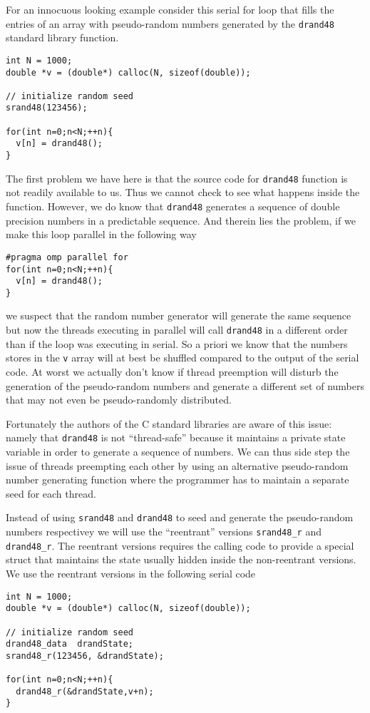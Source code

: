 For an innocuous looking example consider this serial for loop that fills the entries of an array with pseudo-random numbers generated by the \texttt{drand48} standard library function.
\begin{verbatim}
int N = 1000;
double *v = (double*) calloc(N, sizeof(double));

// initialize random seed
srand48(123456);

for(int n=0;n<N;++n){
  v[n] = drand48();
}
\end{verbatim}
The first problem we have here is that the source code for \texttt{drand48} function is not readily available to us. Thus we cannot check to see what happens inside the function. However, we do know that \texttt{drand48} generates a sequence of double precision numbers in a predictable sequence. And therein lies the problem, if we make this loop parallel in the following way 
\begin{verbatim}
#pragma omp parallel for
for(int n=0;n<N;++n){
  v[n] = drand48();
}
\end{verbatim}
we suspect that the random number generator will generate the same sequence but now the threads executing in parallel will call \texttt{drand48} in a different order than if the loop was executing in serial. So a priori we know that the numbers stores in the \texttt{v} array will at best be shuffled compared to the output of the serial code. At worst we actually don't know if thread preemption will disturb the generation of the pseudo-random numbers and generate a different set of numbers that may not even be pseudo-randomly distributed.

Fortunately the authors of the C standard libraries are aware of this issue: namely that \texttt{drand48} is not ``thread-safe'' because it maintains a private state variable in order to generate a sequence of numbers. We can thus side step the issue of threads preempting each other by using an alternative pseudo-random number generating function where the programmer has to maintain a separate seed for each thread. 

Instead of using \texttt{srand48} and \texttt{drand48} to seed and generate the pseudo-random numbers respectivey we will use the ``reentrant'' versions \texttt{srand48\_r} and \texttt{drand48\_r}. The reentrant versions requires the calling code to provide a special struct that maintains the state usually hidden inside the non-reentrant versions. We use the reentrant versions in the following serial code

\begin{verbatim}
int N = 1000;
double *v = (double*) calloc(N, sizeof(double));

// initialize random seed
drand48_data  drandState;
srand48_r(123456, &drandState);

for(int n=0;n<N;++n){
  drand48_r(&drandState,v+n);
}
\end{verbatim}

